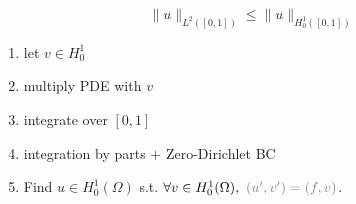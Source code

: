             \vspace{0.5em}
            $$
                \lVert u \rVert _{L^2([0,1])} \leq \lVert u \rVert _{H_0^1([0,1])}
            $$
            \vspace{-0.5em}
            \begin{enumerate}
                \item let $v \in H_0^1$
                \item multiply PDE with $v$
                \item integrate over $[0,1]$
                \item integration by parts $+$ Zero-Dirichlet BC
                \item Find $u \in H_0^1(\Omega)$ s.t. $\forall v \in H_0^1(\Omega),\ {\color{gray}(u',v') = (f,v)}$.
            \end{enumerate}
